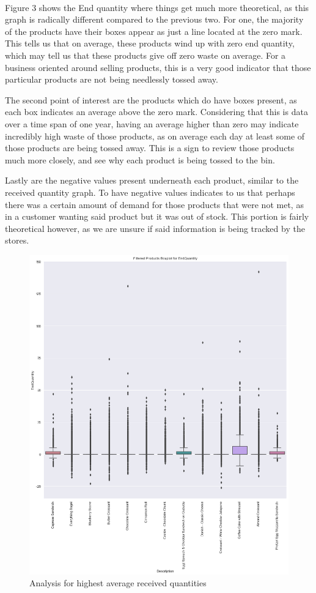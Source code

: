 \\
Figure 3 shows the End quantity where things get much more theoretical, as this graph is radically different compared to the previous two. For one, the majority of the products have their boxes appear as just a line located at the zero mark. This tells us that on average, these products wind up with zero end quantity, which may tell us that these products give off zero waste on average. For a business oriented around selling products, this is a very good indicator that those particular products are not being needlessly tossed away.

The second point of interest are the products which do have boxes present, as each box indicates an average above the zero mark. Considering that this is data over a time span of one year, having an average higher than zero may indicate incredibly high waste of those products, as on average each day at least some of those products are being tossed away. This is a sign to review those products much more closely, and see why each product is being tossed to the bin.

Lastly are the negative values present underneath each product, similar to the received quantity graph. To have negative values indicates to us that perhaps there was a certain amount of demand for those products that were not met, as in a customer wanting said product but it was out of stock. This portion is fairly theoretical however, as we are unsure if said information is being tracked by the stores.  

\begin{figure}[ht]
    \centering
    \includegraphics[width = 0.7\linewidth]{figures/figure3.png}
    \caption{Analysis for highest average received quantities }
\end{figure}

